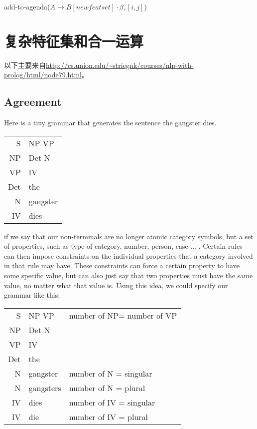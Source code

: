 \documentclass{article}
\begin{document}
\begin{CJK}{UTF8}{gbsn}
\begin{algorithm}
\vspace{1pc}
\begin{algorithmic}
\STATE add-to-agenda($A\to B[newfeatset]\cdot \beta,[i,j]$)
\ENDIF
\ENDFOR
\end{algorithmic}
\label{alg:bindcp}
\end{algorithm}

\section{复杂特征集和合一运算}

以下主要来自\url{http://cs.union.edu/~striegnk/courses/nlp-with-prolog/html/node79.html}。

\subsection{Agreement}

Here is a tiny grammar that generates the sentence the gangster dies. 

\begin{center}
\begin{tabular}{r@{ $\to$ }l}
S & NP VP \\
NP & Det N \\
VP & IV \\
Det & the \\
N & gangster \\
IV & dies
\end{tabular}
\end{center}

if we say that our non-terminals are no longer atomic category symbols, but a set of properties, such as type of category, number, person, case ... . Certain rules can then impose constraints on the individual properties that a category involved in that rule may have. These constraints can force a certain property to have some specific value, but can also just say that two properties must have the same value, no matter what that value is. Using this idea, we could specify our grammar like this: 

\begin{center}
\begin{tabular}{r@{ $\to$ }l@{ : }l}
S & NP VP & number of NP= number of VP \\
NP & Det N \\
VP & IV \\
Det & the \\
N & gangster & number of N = singular \\
N & gangsters & number of N = plural \\
IV & dies & number of IV = singular \\
IV & die & number of IV = plural
\end{tabular}
\end{center}


\end{CJK}
\end{document}
